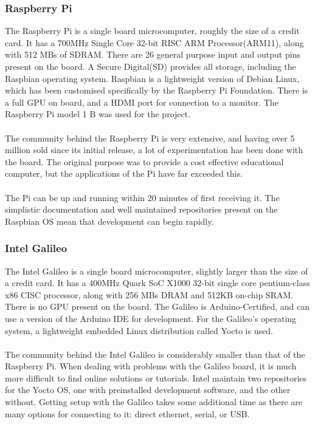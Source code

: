 \documentclass{article}
\begin{document}
\subsubsection{Raspberry Pi}
The Raspberry Pi is a single board microcomputer, roughly the size of a credit card. It has a 700MHz Single Core 32-bit RISC ARM Processor(ARM11), along with 512 MBs of SDRAM. There are 26 general purpose input and output pins present on the board. A Secure Digital(SD) provides all storage, including the Raspbian operating system. Raspbian is a lightweight version of Debian Linux, which has been customised specifically by the Raspberry Pi Foundation. There is a full GPU on board, and a HDMI port for connection to a monitor. The Raspberry Pi model 1 B was used for the project. \\\\
The community behind the Raspberry Pi is very extensive, and having over 5 million sold since its initial release, a lot of experimentation has been done with the board. The original purpose was to provide a cost effective educational computer, but the applications of the Pi have far exceeded this.\\\\
The Pi can be up and running within 20 minutes of first receiving it. The simplistic documentation and well maintained repositories present on the Raspbian OS mean that development can begin rapidly. 
\subsubsection{Intel Galileo}
The Intel Galileo is a single board microcomputer, slightly larger than the size of a credit card. It has a 400MHz Quark SoC X1000 32-bit single core pentium-class x86 CISC processor, along with 256 MBs DRAM and 512KB on-chip SRAM. There is no GPU present on the board. The Galileo is Arduino-Certified, and can use a version of the Arduino IDE for development. For the Galileo\rq s operating system, a lightweight embedded Linux distribution called Yocto is used. \\\\
The community behind the Intel Galileo is considerably smaller than that of the Raspberry Pi. When dealing with problems with the Galileo board, it is much more difficult to find online solutions or tutorials. Intel maintain two repositories for the Yocto OS, one with preinstalled development software, and the other without. Getting setup with the Galileo takes some additional time as there are many options for connecting to it: direct ethernet, serial, or USB. 
\end{document}
